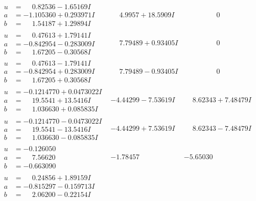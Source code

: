 \documentclass[1p]{elsarticle_modified}
\theoremstyle{definition}
\begin{document}
$$\begin{array}{c|c|c}
\begin{aligned}
u &= \phantom{-}0.82536 - 1.65169 I \\
a &= -1.105360 + 0.293971 I \\
b &= \phantom{-}1.54187 + 1.29894 I\end{aligned}
 & \phantom{-}4.9957 + 18.5909 I & \phantom{-0.000000 } 0 \\ \hline\begin{aligned}
u &= \phantom{-}0.47613 + 1.79141 I \\
a &= -0.842954 - 0.283009 I \\
b &= \phantom{-}1.67205 - 0.30568 I\end{aligned}
 & \phantom{-}7.79489 + 0.93405 I & \phantom{-0.000000 } 0 \\ \hline\begin{aligned}
u &= \phantom{-}0.47613 - 1.79141 I \\
a &= -0.842954 + 0.283009 I \\
b &= \phantom{-}1.67205 + 0.30568 I\end{aligned}
 & \phantom{-}7.79489 - 0.93405 I & \phantom{-0.000000 } 0 \\ \hline\begin{aligned}
u &= -0.1214770 + 0.0473022 I \\
a &= \phantom{-}19.5541 + 13.5416 I \\
b &= \phantom{-}1.036630 + 0.085835 I\end{aligned}
 & -4.44299 - 7.53619 I & \phantom{-}8.62343 + 7.48479 I \\ \hline\begin{aligned}
u &= -0.1214770 - 0.0473022 I \\
a &= \phantom{-}19.5541 - 13.5416 I \\
b &= \phantom{-}1.036630 - 0.085835 I\end{aligned}
 & -4.44299 + 7.53619 I & \phantom{-}8.62343 - 7.48479 I \\ \hline\begin{aligned}
u &= -0.126050\phantom{ +0.000000I} \\
a &= \phantom{-}7.56620\phantom{ +0.000000I} \\
b &= -0.663090\phantom{ +0.000000I}\end{aligned}
 & -1.78457\phantom{ +0.000000I} & -5.65030\phantom{ +0.000000I} \\ \hline\begin{aligned}
u &= \phantom{-}0.24856 + 1.89159 I \\
a &= -0.815297 - 0.159713 I \\
b &= \phantom{-}2.06200 - 0.22154 I\end{aligned}

\end{array}$$
\end{document}

